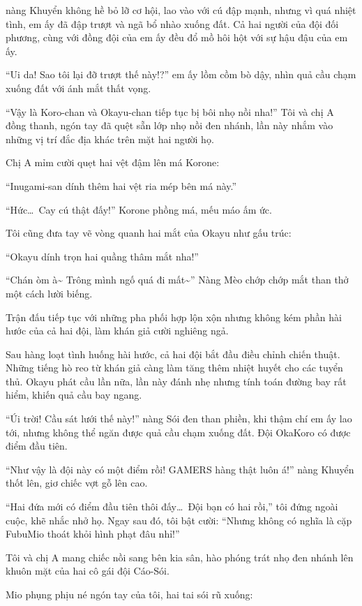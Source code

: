 \documentclass[../main.tex]{subfiles}
\begin{document}
nàng Khuyển không hề bỏ lỡ cơ hội, lao vào với cú đập mạnh, nhưng vì quá nhiệt tình, em ấy đã đập trượt và ngã bổ nhào xuống đất. Cả hai người của đội đối phương, cùng với đồng đội của em ấy đều đổ mồ hôi hột với sự hậu đậu của em ấy.

``Ui da! Sao tôi lại đỡ trượt thế này!?'' em ấy lồm cồm bò dậy, nhìn quả cầu chạm xuống đất với ánh mắt thất vọng.

``Vậy là Koro-chan và Okayu-chan tiếp tục bị bôi nhọ nồi nha!'' Tôi và chị A đồng thanh, ngón tay đã quệt sẵn lớp nhọ nồi đen nhánh, lần này nhắm vào những vị trí đắc địa khác trên mặt hai người họ.

Chị A mỉm cười quẹt hai vệt đậm lên má Korone:

``Inugami-san dính thêm hai vệt ria mép bên má này.''

``Hức\dots\ Cay cú thật đấy!'' Korone phồng má, mếu máo ấm ức.

Tôi cũng đưa tay vẽ vòng quanh hai mắt của Okayu như gấu trúc:

``Okayu dính trọn hai quầng thâm mắt nha!''

``Chán òm à\~{} Trông mình ngố quá đi mất\~{}'' Nàng Mèo chớp chớp mắt than thở một cách lười biếng.

Trận đấu tiếp tục với những pha phối hợp lộn xộn nhưng không kém phần hài hước của cả hai đội, làm khán giả cười nghiêng ngả.

Sau hàng loạt tình huống hài hước, cả hai đội bắt đầu điều chỉnh chiến thuật. Những tiếng hò reo từ khán giả càng làm tăng thêm nhiệt huyết cho các tuyển thủ. Okayu phát cầu lần nữa, lần này đánh nhẹ nhưng tính toán đường bay rất hiểm, khiến quả cầu bay ngang.

``Úi trời! Cầu sát lưới thế này!'' nàng Sói đen than phiền, khi thậm chí em ấy lao tới, nhưng không thể ngăn được quả cầu chạm xuống đất. Đội OkaKoro có được điểm đầu tiên.

``Như vậy là đội này có một điểm rồi! GAMERS hàng thật luôn á!'' nàng Khuyển thốt lên, giơ chiếc vợt gỗ lên cao.

``Hai đứa mới có điểm đầu tiên thôi đấy\dots\ Đội bạn có hai rồi,'' tôi đứng ngoài cuộc, khẽ nhắc nhở họ. Ngay sau đó, tôi bật cười: ``Nhưng không có nghĩa là cặp FubuMio thoát khỏi hình phạt đâu nhỉ!''

Tôi và chị A mang chiếc nồi sang bên kia sân, hào phóng trát nhọ đen nhánh lên khuôn mặt của hai cô gái đội Cáo-Sói.

Mio phụng phịu né ngón tay của tôi, hai tai sói rũ xuống:
\end{document}
